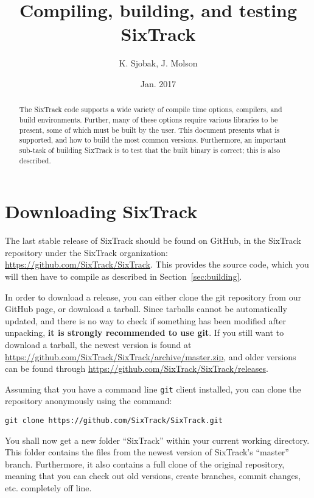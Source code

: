 \documentclass[english,BCOR=0mm,DIV=18]{scrartcl}
\begin{document}
\raggedbottom

\author{K. Sjobak, J. Molson}
\title{Compiling, building, and testing SixTrack}
\date{Jan. 2017}

\maketitle

\begin{abstract}
  The SixTrack code supports a wide variety of compile time options, compilers, and build environments.
  Further, many of these options require various libraries to be present, some of which must be built by the user.
  This document presents what is supported, and how to build the most common versions.
  Furthermore, an important sub-task of building SixTrack is to test that the built binary is correct; this is also described.
\end{abstract}

\tableofcontents
\newpage

\section{Downloading SixTrack}
\label{sec:downloading}
The last stable release of SixTrack should be found on GitHub, in the SixTrack repository under the SixTrack organization:
\url{https://github.com/SixTrack/SixTrack}.
This provides the source code, which you will then have to compile as described in Section~\ref{sec:building}.

In order to download a release, you can either clone the git repository from our GitHub page, or download a tarball.
Since tarballs cannot be automatically updated, and there is no way to check if something has been modified after unpacking, \textbf{it is strongly recommended to use git}.
If you still want to download a tarball, the newest version is found at\\
\url{https://github.com/SixTrack/SixTrack/archive/master.zip}, and older versions can be found through
\url{https://github.com/SixTrack/SixTrack/releases}.

Assuming that you have a command line \texttt{git} client installed, you can clone the repository anonymously using the command:
\begin{lstlisting}
git clone https://github.com/SixTrack/SixTrack.git
\end{lstlisting}
You shall now get a new folder ``SixTrack'' within your current working directory.
This folder contains the files from the newest version of SixTrack's ``master'' branch.
Furthermore, it also contains a full clone of the original repository, meaning that you can check out old versions, create branches, commit changes, etc. completely off line.
\end{document}
